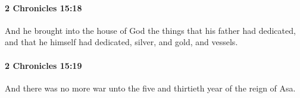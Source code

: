 		\paragraph{2 Chronicles 15:18} %
			\label{2CHRONICLES-15-18}

			And he brought into the house of God the things that his father had dedicated, and that he himself had dedicated, silver, and gold, and vessels.


		\paragraph{2 Chronicles 15:19} %
			\label{2CHRONICLES-15-19}

			And there was no more war unto the five and thirtieth year of the reign of Asa.

